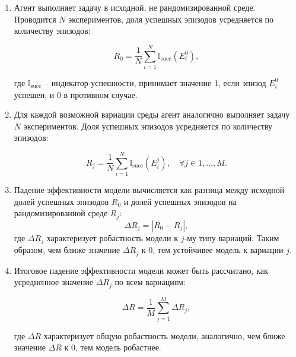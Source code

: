         \begin{enumerate}
            \item Агент выполняет задачу в исходной, не рандомизированной среде. Проводится $N$ экспериментов, доля успешных эпизодов усредняется по количеству эпизодов:

            \begin{equation}
                \label{eq:R0}
                R_0 = \frac{1}{N} \sum_{i=1}^N \mathbb{I}_{\text{succ}}(E^0_i),
            \end{equation}

            где $\mathbb{I}_{\text{succ}}$ -- индикатор успешности, принимает значение 1, если эпизод $E^0_i$ успешен, и 0 в противном случае. 

            \item Для каждой возможной вариации среды агент аналогично выполняет задачу $N$ экспериментов. Доля успешных эпизодов усредняется по количеству эпизодов:

            \begin{equation}
                \label{eq:Rj}
                R_j = \frac{1}{N} \sum_{i=1}^N \mathbb{I}_{\text{succ}}(E^j_i), \quad \forall j \in {1, \dots, M}.
            \end{equation}

            \item Падение эффективности модели вычисляется как разница между исходной долей успешных эпизодов $R_0$ и долей успешных эпизодов на рандомизированной среде $R_j$:  
            \begin{equation}  
                \label{eq:Rjdelta}
                \Delta R_j = |R_0 - R_j| ,
            \end{equation}  
            где $\Delta R_j$ характеризует робастность модели к $j$-му типу вариаций. Таким образом, чем ближе значение $\Delta R_j$ к $0$, тем устойчивее модель к вариации $j$.

            \item Итоговое падение эффективности модели может быть рассчитано, как усредненное значение $\Delta R_j$ по всем вариациям:

            \begin{equation}  
                \label{eq:Rdelta}
                \Delta R = \frac{1}{M} \sum_{j=1}^M \Delta R_j ,
            \end{equation}  

            где $\Delta R$ характеризует общую робастность модели, аналогично, чем ближе значение $\Delta R$ к $0$, тем модель робастнее.
            
        \end{enumerate}

